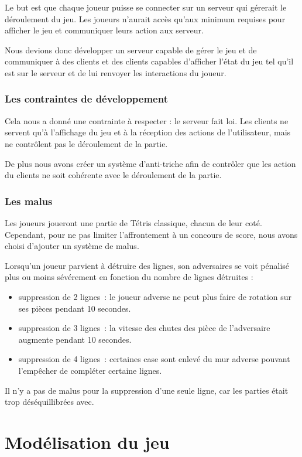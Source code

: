 \documentclass[a4paper, 12pt]{article}
\begin{document}
			Le but est que chaque joueur puisse se connecter sur un serveur qui gérerait le déroulement du jeu.
			Les joueurs n'aurait accès qu'aux minimum requises pour afficher le jeu et communiquer leurs action aux serveur. 


			Nous devions donc développer un serveur capable de gérer le jeu et de communiquer à des clients et des clients capables d'afficher l'état du jeu tel qu'il est sur le serveur et de lui renvoyer les interactions du joueur.


		\subsubsection{Les contraintes de développement}
			Cela nous a donné une contrainte à respecter : le serveur fait loi. Les clients ne servent qu'à l'affichage du jeu et à la réception des actions de l'utilisateur, mais ne contrôlent pas le déroulement de la partie.

			De plus nous avons créer un système d'anti-triche afin de contrôler que les action du clients ne soit cohérente avec le déroulement de la partie.

		\subsubsection{Les malus}
			Les joueurs joueront une partie de Tétris classique, chacun de leur coté. Cependant, pour ne pas limiter l'affrontement à un concours de score, nous avons choisi d'ajouter un système de malus.

			Lorsqu'un joueur parvient à détruire des lignes, son adversaires se voit pénalisé plus ou moins sévérement en fonction du nombre de lignes détruites :
			\begin{itemize}
				\item suppression de 2 lignes : le joueur adverse ne peut plus faire de rotation sur ses pièces pendant 10 secondes.
				\item suppression de 3 lignes : la vitesse des chutes des pièce de l’adversaire augmente pendant 10 secondes.
				\item suppression de 4 lignes : certaines case sont enlevé du mur adverse pouvant l’empêcher de compléter certaine lignes.
			\end{itemize}

			Il n'y a pas de malus pour la suppression d'une seule ligne, car les parties était trop déséquillibrées avec.

	\section{Modélisation du jeu}
\end{document}
